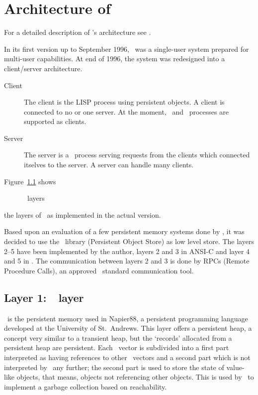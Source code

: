 %

\chapter[Architecture]%
{Architecture of \protect\plob}

For a detailed description of \protect\plob's architecture see
\cite{bib:Kirschke-99}.

In its first version up to September 1996, \plob\ was a single-user
system prepared for multi-user capabilities. At end of 1996, the
system was redesigned into a client/server architecture.
\begin{description}

\item[Client] The client is the LISP process using persistent
  objects. A client is connected to no or one server. At the moment,
  \lwcl\ and \allegrocl\ processes are supported as clients.

\item[Server] The server is a \unix\ process serving requests from the
  clients which connected itselves to the server. A server can handle
  many clients.

\end{description}

Figure~\ref{sec:PLOBwRPCs} shows 
\begin{figure}[htbp]
\centerline{}
\caption{\protect\plob\ layers}%
\label{sec:PLOBwRPCs}
\end{figure}%
the layers of \plob\ as implemented in the actual version.

Based upon an evaluation of a few persistent memory systems done by
\cite{bib:Mueller-91}, it was decided to use the \postore\ library
(Persistent Object Store) as low level store.  The layers 2--5 have
been implemented by the author, layers 2 and 3 in ANSI-C and layer 4
and 5 in \cl. The communication between layers 2 and 3 is done by RPCs
(Remote Procedure Calls), an approved \unix\ standard communication
tool.

\section[POSTORE layer]%
{Layer 1:\ \protect\postore\ layer}

\postore\ is the persistent memory used in Napier88, a persistent
programming language developed at the University of St.\ Andrews.
This layer offers a persistent heap, a concept very similar to a
transient heap, but the `records' allocated from a persistent heap are
persistent. Each \postore\ vector is subdivided into a first part
interpreted as having references to other \postore\ vectors and a
second part which is not interpreted by \postore\ any further; the
second part is used to store the state of value-like objects, that
means, objects not referencing other objects. This is used by
\postore\ to implement a garbage collection based on reachability.

